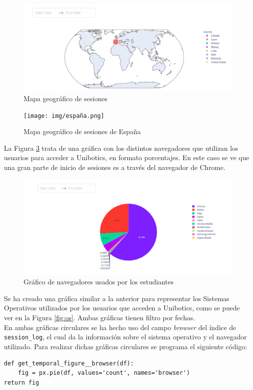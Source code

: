 \begin{figure}[H]
    \centering
    \includegraphics[width=17cm, keepaspectratio]{img/mundo.png}
    \caption{Mapa geográfico de sesiones}
    \label{fig:mundo}
\end{figure}
\begin{figure}[H]
    \centering
    \texttt{[image: img/españa.png]}
    \caption{Mapa geográfico de sesiones de España}
    \label{fig:mundo}
\end{figure}
La Figura \ref{fig:browser} trata de una gráfica con los distintos navegadores que utilizan los usuarios para acceder a Unibotics, en formato porcentajes. En este caso se ve que una gran parte de inicio de sesiones es a través del navegador de Chrome. 


\begin{figure}[H]
    \centering
    \includegraphics[width=18cm, keepaspectratio]{img/browser.png}
    \caption{Gráfico de navegadores usados por los estudiantes}
    \label{fig:browser}
\end{figure}
Se ha creado una gráfica similar a la anterior para representar los Sistemas Operativos utilizados por los usuarios que acceden a Unibotics, como se puede ver en la Figura \ref{fig:os}. Ambas gráficas tienen filtro por fechas.\\

En ambas gráficas circulares se ha hecho uso del campo \textit{browser} del índice de \texttt{session\_log}, el cual da la información sobre el sistema operativo y el navegador utilizado. Para realizar dichas gráficas circulares se programa el siguiente código:
\begin{lstlisting}
def get_temporal_figure__browser(df):
    fig = px.pie(df, values='count', names='browser')
return fig
\end{lstlisting}

